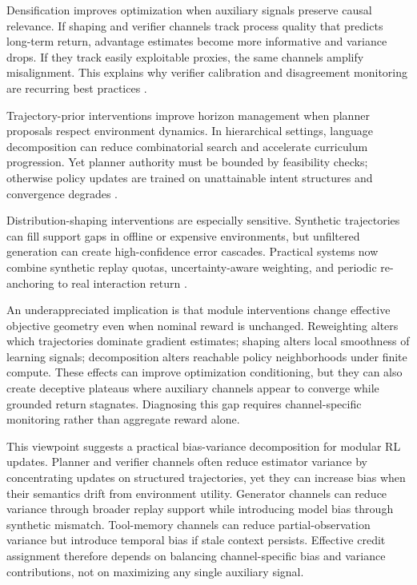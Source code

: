 ﻿\documentclass[conference]{IEEEtran}
\begin{document}
Densification improves optimization when auxiliary signals preserve causal relevance. If shaping and verifier channels track process quality that predicts long-term return, advantage estimates become more informative and variance drops. If they track easily exploitable proxies, the same channels amplify misalignment. This explains why verifier calibration and disagreement monitoring are recurring best practices \cite{arxiv_p_2602_06493,arxiv_p_2602_12579,arxiv_p_2508_03680,arxiv_p_2602_02395}.

Trajectory-prior interventions improve horizon management when planner proposals respect environment dynamics. In hierarchical settings, language decomposition can reduce combinatorial search and accelerate curriculum progression. Yet planner authority must be bounded by feasibility checks; otherwise policy updates are trained on unattainable intent structures and convergence degrades \cite{arxiv_p_2602_16165,arxiv_p_2510_24699,arxiv_p_2512_20275}.

Distribution-shaping interventions are especially sensitive. Synthetic trajectories can fill support gaps in offline or expensive environments, but unfiltered generation can create high-confidence error cascades. Practical systems now combine synthetic replay quotas, uncertainty-aware weighting, and periodic re-anchoring to real interaction return \cite{arxiv_p_2601_08107,arxiv_p_2602_14468,arxiv_p_2601_22149}.

An underappreciated implication is that module interventions change effective objective geometry even when nominal reward is unchanged. Reweighting alters which trajectories dominate gradient estimates; shaping alters local smoothness of learning signals; decomposition alters reachable policy neighborhoods under finite compute. These effects can improve optimization conditioning, but they can also create deceptive plateaus where auxiliary channels appear to converge while grounded return stagnates. Diagnosing this gap requires channel-specific monitoring rather than aggregate reward alone.

This viewpoint suggests a practical bias-variance decomposition for modular RL updates. Planner and verifier channels often reduce estimator variance by concentrating updates on structured trajectories, yet they can increase bias when their semantics drift from environment utility. Generator channels can reduce variance through broader replay support while introducing model bias through synthetic mismatch. Tool-memory channels can reduce partial-observation variance but introduce temporal bias if stale context persists. Effective credit assignment therefore depends on balancing channel-specific bias and variance contributions, not on maximizing any single auxiliary signal.
\end{document}
